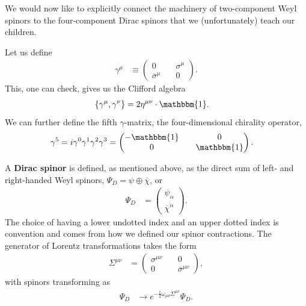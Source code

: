 \documentclass[12pt, oneside]{report}    %
\begin{document}
We would now like to explicitly connect the machinery of two-component Weyl spinors to the four-component Dirac spinors that we (unfortunately) teach our children.

Let us define
\begin{align}
    \gamma^\mu & \equiv \begin{pmatrix}0\quad&\sigma^\mu\\\overline\sigma^\mu\quad&0\end{pmatrix}.\label{eq:SUSYalg:gamma:weylrep}
\end{align}
This, one can check, gives us the Clifford algebra
\begin{align}
    \left\{\gamma^\mu,\gamma^\nu\right\} &= 2\eta^{\mu\nu}\cdot\mathbbm{1}.
\end{align}
We can further define the fifth $\gamma$-matrix, the four-dimensional chirality operator,
\begin{align}
    \gamma^5 &= i\gamma^0\gamma^1\gamma^2\gamma^3 = \begin{pmatrix}-\mathbbm{1}\quad&0\\0\quad&\mathbbm{1}\end{pmatrix}.
\end{align}
% 


A \textbf{Dirac spinor} is defined, as mentioned above, as the direct sum of left- and right-handed Weyl spinors, $\Psi_D = \psi\oplus\overline\chi$, or
\begin{align}
    \Psi_D &= \begin{pmatrix}
        \psi_\alpha\\\overline\chi^{\dot\alpha}
    \end{pmatrix}.
\end{align} 
The choice of having a lower undotted index and an upper dotted index is convention and comes from how we defined our spinor contractions. The generator of Lorentz transformations takes the form
\begin{align}
    \Sigma^{\mu\nu} &=  \begin{pmatrix}
                            \sigma^{\mu\nu} &\quad 0\\
                            0               &\quad \overline\sigma^{\mu\nu}
                        \end{pmatrix},
\end{align}
with spinors transforming as
\begin{align}
    \Psi_D &\rightarrow e^{-\frac i2 \omega_{\mu\nu}\Sigma^{\mu\nu}}\Psi_D.
\end{align}
\end{document}
